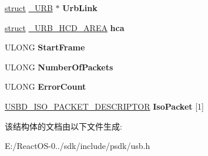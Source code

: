\begin{DoxyCompactItemize}
\item 
\mbox{\label{struct___u_r_b___i_s_o_c_h___t_r_a_n_s_f_e_r_ac386e1c044aa2c1b7e4120d84bfbbc78}} 
\hyperlink{interfacestruct}{struct} \hyperlink{struct___u_r_b}{\+\_\+\+U\+RB} $\ast$ {\bfseries Urb\+Link}
\item 
\mbox{\label{struct___u_r_b___i_s_o_c_h___t_r_a_n_s_f_e_r_a235edde12a5db9c58ee5a1bbb36d1a01}} 
\hyperlink{interfacestruct}{struct} \hyperlink{struct___u_r_b___h_c_d___a_r_e_a}{\+\_\+\+U\+R\+B\+\_\+\+H\+C\+D\+\_\+\+A\+R\+EA} {\bfseries hca}
\item 
\mbox{\label{struct___u_r_b___i_s_o_c_h___t_r_a_n_s_f_e_r_a182b83606cf2e62c852b57bec04657d4}} 
U\+L\+O\+NG {\bfseries Start\+Frame}
\item 
\mbox{\label{struct___u_r_b___i_s_o_c_h___t_r_a_n_s_f_e_r_a74fa59fbac0a7bb84b39296c78b3a832}} 
U\+L\+O\+NG {\bfseries Number\+Of\+Packets}
\item 
\mbox{\label{struct___u_r_b___i_s_o_c_h___t_r_a_n_s_f_e_r_a17078adce22da77c590dfed57fd81757}} 
U\+L\+O\+NG {\bfseries Error\+Count}
\item 
\mbox{\label{struct___u_r_b___i_s_o_c_h___t_r_a_n_s_f_e_r_a4caf015f835105153cc618401067371a}} 
\hyperlink{struct___u_s_b_d___i_s_o___p_a_c_k_e_t___d_e_s_c_r_i_p_t_o_r}{U\+S\+B\+D\+\_\+\+I\+S\+O\+\_\+\+P\+A\+C\+K\+E\+T\+\_\+\+D\+E\+S\+C\+R\+I\+P\+T\+OR} {\bfseries Iso\+Packet} \mbox{[}1\mbox{]}
\end{DoxyCompactItemize}


该结构体的文档由以下文件生成\+:\begin{DoxyCompactItemize}
\item 
E\+:/\+React\+O\+S-\/0../sdk/include/psdk/usb.\+h\end{DoxyCompactItemize}
